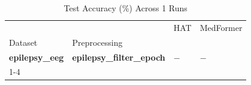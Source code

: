 \begin{table}
\caption{Test Accuracy (\%) Across 1 Runs}
\label{tab:results_acc}
\begin{tabular}{llll}
\toprule
 &  & HAT & MedFormer \\
Dataset & Preprocessing &  &  \\
\midrule
\textbf{epilepsy_eeg} & \textbf{epilepsy_filter_epoch} & $-$ & $-$ \\
\cline{1-4}
\bottomrule
\end{tabular}
\end{table}

